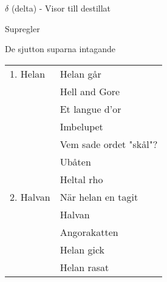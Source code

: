 \documentclass[a6paper,10pt]{article}
\begin{document}
\vspace{5pt}

\noindent \Large $\delta$ (delta) - Visor till destillat

\normalsize

\vspace{3pt}

\noindent Supregler

\vspace{3pt}

\noindent De sjutton suparna intagande

\vspace{3pt}

\noindent
\begin{tabularx}{0.8\textwidth}{l X}
1. Helan&Helan går\\
&Hell and Gore\\
&Et langue d'or\\
&Imbelupet\\
&Vem sade ordet "skål"?\\
&Ubåten\\
&Heltal rho\\
2. Halvan&När helan en tagit\\
&Halvan\\
&Angorakatten\\
&Helan gick\\
&Helan rasat
\end{tabularx}
\end{document}

